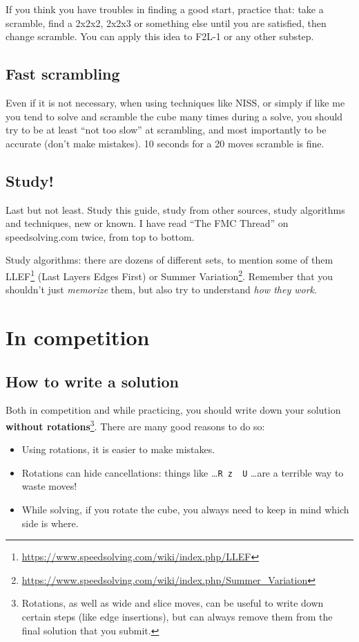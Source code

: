 \documentclass[11pt,a4paper]{book}
\newcommand{\p}{\textquotesingle}
\newcommand{\m}{\texttt}
\newcommand{\ps}{\p\,\,}
\begin{document}
If you think you have troubles in finding a good start, practice that: take a scramble, find a 2x2x2, 2x2x3 or something else until you are satisfied, then change scramble. You can apply this idea to F2L-1 or any other substep.

\section{Fast scrambling}

Even if it is not necessary, when using techniques like NISS, or simply if like me you tend to solve and scramble the cube many times during a solve, you should try to be at least ``not too slow'' at scrambling, and most importantly to be accurate (don't make mistakes). 10 seconds for a 20 moves scramble is fine.

\section{Study!}

Last but not least. Study this guide, study from other sources, study algorithms and techniques, new or known. I have read ``The FMC Thread'' on speedsolving.com twice, from top to bottom.

Study algorithms: there are dozens of different sets, to mention some of them LLEF\footnote{\url{https://www.speedsolving.com/wiki/index.php/LLEF}} (Last Layers Edges First) or Summer Variation\footnote{\url{https://www.speedsolving.com/wiki/index.php/Summer_Variation}}. Remember that you shouldn't just \emph{memorize} them, but also try to understand \emph{how they work}.

\chapter{In competition}

\section{How to write a solution}
\label{write_down}

Both in competition and while practicing, you should write down your solution \textbf{without rotations}\footnote{Rotations, as well as wide and slice moves, can be useful to write down certain steps (like edge insertions), but can always remove them from the final solution that you submit.}. There are many good reasons to do so:

\begin{itemize}
\item Using rotations, it is easier to make mistakes.
\item Rotations can hide cancellations: things like \dots \m{R z\ps U\p} \dots are a terrible way to waste moves!
\item While solving, if you rotate the cube, you always need to keep in mind which side is where.
\end{itemize}
\end{document}
